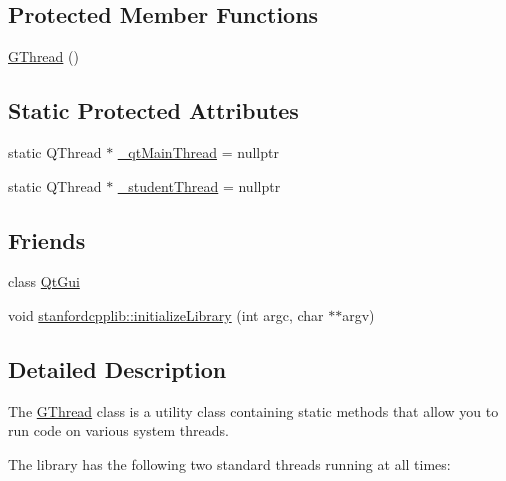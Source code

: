 \subsection*{Protected Member Functions}
\begin{DoxyCompactItemize}
\item 
\mbox{\hyperlink{classGThread_a7db4904140090c18f864e09283f2b529}{G\+Thread}} ()
\end{DoxyCompactItemize}
\subsection*{Static Protected Attributes}
\begin{DoxyCompactItemize}
\item 
static Q\+Thread $\ast$ \mbox{\hyperlink{classGThread_aa69140e62a4dad275e74a6c1174eb4e5}{\+\_\+qt\+Main\+Thread}} = nullptr
\item 
static Q\+Thread $\ast$ \mbox{\hyperlink{classGThread_a15ae7c95a54d17d2c307ebba42fe3405}{\+\_\+student\+Thread}} = nullptr
\end{DoxyCompactItemize}
\subsection*{Friends}
\begin{DoxyCompactItemize}
\item 
class \mbox{\hyperlink{classGThread_a78e6068a40352424a09cd3753706c619}{Qt\+Gui}}
\item 
void \mbox{\hyperlink{classGThread_a4f1fcd681e2cf92d1b04e5e8a33dbe47}{stanfordcpplib\+::initialize\+Library}} (int argc, char $\ast$$\ast$argv)
\end{DoxyCompactItemize}


\subsection{Detailed Description}
The \mbox{\hyperlink{classGThread}{G\+Thread}} class is a utility class containing static methods that allow you to run code on various system threads. 

The library has the following two standard threads running at all times\+:


